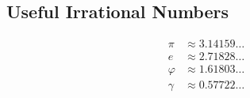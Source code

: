 
\subsection*{Useful Irrational Numbers}
\begin{align*}
     \pi & \approx 3.14159 \ldots \\
       e & \approx 2.71828 \ldots \\
 \varphi & \approx 1.61803 \ldots \\
  \gamma & \approx 0.57722 \ldots \\
\end{align*}
